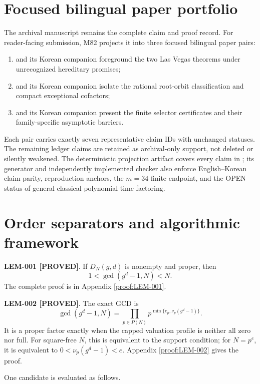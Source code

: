 \documentclass[11pt]{article}
\newcommand{\claimstatus}[2]{\textbf{#1 [#2]}}
\begin{document}
\section{Focused bilingual paper portfolio}

The archival manuscript remains the complete claim and proof record.  For
reader-facing submission, M82 projects it into three focused bilingual paper
pairs:
\begin{enumerate}
\item {} and its Korean
  companion foreground the two Las Vegas theorems under unrecognized
  hereditary promises;
\item {} and its Korean
  companion isolate the rational root-orbit classification and compact
  exceptional cofactors;
\item {} and its Korean
  companion present the finite selector certificates and their
  family-specific asymptotic barriers.
\end{enumerate}
Each pair carries exactly seven representative claim IDs with unchanged
statuses. The remaining ledger claims are retained as archival-only support,
not deleted or silently weakened. The deterministic projection artifact
 covers every claim in
; its generator and independently implemented
checker also enforce English--Korean claim parity, reproduction anchors,
the \(m=34\) finite endpoint, and the OPEN status of general classical
polynomial-time factoring.

\section{Order separators and algorithmic framework}

\claimstatus{LEM-001}{PROVED}. If \(D_N(g,d)\) is nonempty and proper, then
\[
1<\gcd(g^d-1,N)<N.
\]
The complete proof is in Appendix \ref{proof:LEM-001}.

\claimstatus{LEM-002}{PROVED}. The exact GCD is
\[
\gcd(g^d-1,N)=
\prod_{p\in P(N)}
p^{\min\{e_p,\nu_p(g^d-1)\}}.
\]
It is a proper factor exactly when the capped valuation profile is neither all
zero nor full. For square-free \(N\), this is equivalent to the support
condition; for \(N=p^e\), it is equivalent to
\(0<\nu_p(g^d-1)<e\). Appendix \ref{proof:LEM-002} gives the proof.

One candidate is evaluated as follows.
\end{document}
